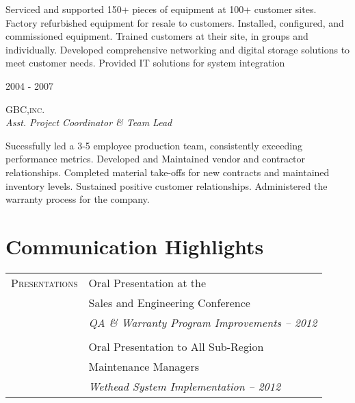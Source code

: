 \documentclass[10pt]{article} %
\begin{document}
\begin{minipage}[t]{0.5\textwidth}
\normalsize{Serviced and supported 150+ pieces of equipment at 100+ customer sites. Factory refurbished equipment for resale to customers. Installed, configured, and commissioned equipment. Trained customers at their site, in groups and individually. Developed comprehensive networking and digital storage solutions to meet customer needs. Provided IT solutions for system integration}\\


{\raggedleft\textsc{2004 - 2007}\par}

{\raggedright\large\textsc{GBC,inc.}\\
\textit{Asst. Project Coordinator \& Team Lead}\\[5pt]}

\normalsize{Sucessfully led a 3-5 employee production team, consistently exceeding performance metrics. Developed and Maintained vendor and contractor relationships. Completed material take-offs for new contracts and maintained inventory levels. Sustained positive customer relationships. Administered the warranty process for the company.}\\


\section{Communication Highlights} 

\begin{tabular}{rl}
\textsc{Presentations}
& Oral Presentation at the  \\
& Sales and Engineering Conference \\
& \textit{QA \& Warranty Program Improvements -- 2012}\\
& \\
& Oral Presentation to All Sub-Region \\
& Maintenance Managers \\
& \textit{Wethead System Implementation -- 2012} \\
\end{tabular}\\[10pt]



\end{minipage} %
\end{document}
